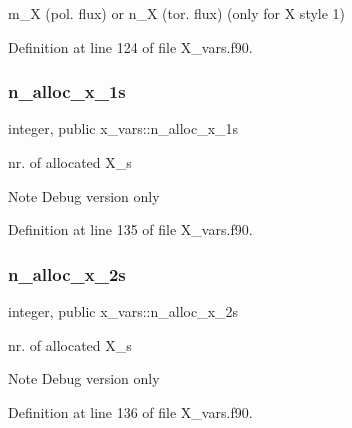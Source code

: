 {\ttfamily m\+\_\+X} (pol. flux) or {\ttfamily n\+\_\+X} (tor. flux) (only for {\ttfamily X} style 1) 



Definition at line 124 of file X\+\_\+vars.\+f90.

\mbox{\label{namespacex__vars_af565ad5c65071b130e69d528aa6faf1d}} 
\subsubsection{\texorpdfstring{n\+\_\+alloc\+\_\+x\+\_\+1s}{n\_alloc\_x\_1s}}
{\footnotesize\ttfamily integer, public x\+\_\+vars\+::n\+\_\+alloc\+\_\+x\+\_\+1s}



nr. of allocated {\ttfamily X\+\_}\textquotesingle{}s 

\begin{DoxyNote}{Note}
Debug version only 
\end{DoxyNote}


Definition at line 135 of file X\+\_\+vars.\+f90.

\mbox{\label{namespacex__vars_add0d925899063fbe0c4ff05d21f35a23}} 
\subsubsection{\texorpdfstring{n\+\_\+alloc\+\_\+x\+\_\+2s}{n\_alloc\_x\_2s}}
{\footnotesize\ttfamily integer, public x\+\_\+vars\+::n\+\_\+alloc\+\_\+x\+\_\+2s}



nr. of allocated {\ttfamily X\+\_}\textquotesingle{}s 

\begin{DoxyNote}{Note}
Debug version only 
\end{DoxyNote}


Definition at line 136 of file X\+\_\+vars.\+f90.

\mbox{\label{namespacex__vars_a2e8fe6c5fe1cf61704bf176925d2b02e}} 
